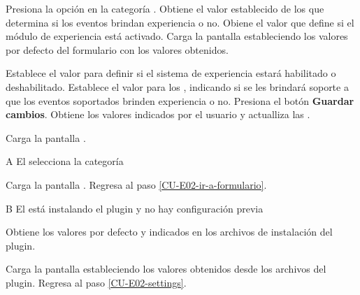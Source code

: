\begin{UCtrayectoria}%
%
   

  \Actor Presiona la opción {\bf {}} en la categoría
         .  \label{CU-E02-ir-a-formulario}
  \Sistema Obtiene el valor establecido de los  que determina si los eventos brindan
           experiencia o no. \label{CU-E03-formulario} 
  \Sistema Obiene el valor  que define si el
           módulo de experiencia está activado.
  \Sistema Carga la pantalla  estableciendo los valores por defecto del
           formulario con los valores obtenidos.

  \Actor Establece el valor  para definir si
         el sistema de experiencia estará habilitado o deshabilitado.
         \label{CU-E02-settings}
  \Actor Establece el valor para los , indicando si se les brindará soporte a que 
         los eventos soportados brinden experiencia o no.
  \Actor Presiona el botón {\bf Guardar cambios}.
  \Sistema Obtiene los valores indicados por el usuario y actualliza las 
           .

  \Sistema Carga la pantalla .

\end{UCtrayectoria}

\begin{UCtrayectoriaA}{A}{%
El  selecciona la categoría }

    \Sistema Carga la pantalla .
    \Sistema Regresa al paso \ref{CU-E02-ir-a-formulario}.
\end{UCtrayectoriaA}

\begin{UCtrayectoriaA}{B}{%
El  está instalando el plugin y no hay configuración previa }

  \Sistema Obtiene los valores por defecto  y
            indicados en los archivos de instalación del
           plugin.

  \Sistema Carga la pantalla  estableciendo los valores obtenidos desde los
           archivos del plugin.
  \Sistema Regresa al paso \ref{CU-E02-settings}.
\end{UCtrayectoriaA}

